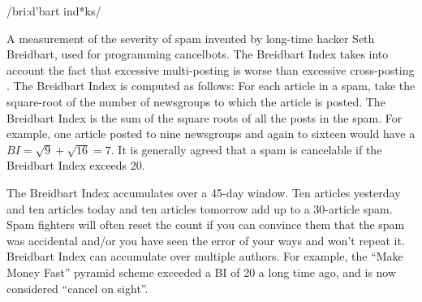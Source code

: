  /bri:d'bart ind*ks/

A measurement of the severity of spam invented by long-time hacker Seth
Breidbart, used for programming cancelbots. The Breidbart Index takes into
account the fact that excessive multi-posting  is worse than
excessive cross-posting . The Breidbart Index is computed as
follows: For each article in a spam, take the square-root of the number of
newsgroups to which the article is posted. The Breidbart Index is the sum of the
square roots of all the posts in the spam. For example, one article posted to
nine newsgroups and again to sixteen would have a $BI=\sqrt{9}+\sqrt{16}=7$. It
is generally agreed that a spam is cancelable if the Breidbart Index exceeds 20.

The Breidbart Index accumulates over a 45-day window. Ten articles yesterday and
ten articles today and ten articles tomorrow add up to a 30-article spam. Spam
fighters will often reset the count if you can convince them that the spam was
accidental and/or you have seen the error of your ways and won't repeat it.
Breidbart Index can accumulate over multiple authors. For example, the ``Make
Money Fast'' pyramid scheme exceeded a BI of 20 a long time ago, and is now
considered ``cancel on sight''.

